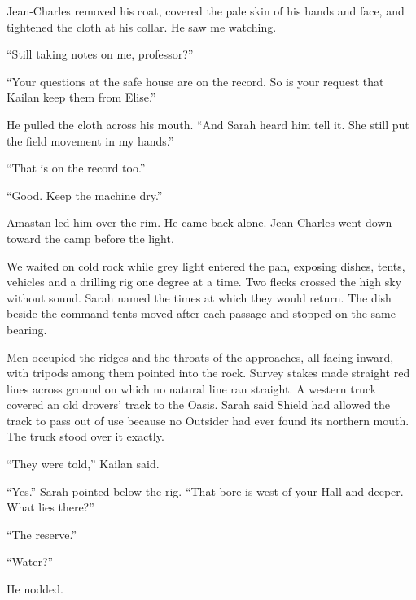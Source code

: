 Jean-Charles removed his coat, covered the pale skin of his hands and face, and tightened the cloth at his collar. He saw me watching.\par

``Still taking notes on me, professor?''\par

``Your questions at the safe house are on the record. So is your request that Kailan keep them from Elise.''\par

He pulled the cloth across his mouth. ``And Sarah heard him tell it. She still put the field movement in my hands.''\par

``That is on the record too.''\par

``Good. Keep the machine dry.''\par

Amastan led him over the rim. He came back alone. Jean-Charles went down toward the camp before the light.\par

We waited on cold rock while grey light entered the pan, exposing dishes, tents, vehicles and a drilling rig one degree at a time. Two flecks crossed the high sky without sound. Sarah named the times at which they would return. The dish beside the command tents moved after each passage and stopped on the same bearing.\par

Men occupied the ridges and the throats of the approaches, all facing inward, with tripods among them pointed into the rock. Survey stakes made straight red lines across ground on which no natural line ran straight. A western truck covered an old drovers' track to the Oasis. Sarah said Shield had allowed the track to pass out of use because no Outsider had ever found its northern mouth. The truck stood over it exactly.\par

``They were told,'' Kailan said.\par

``Yes.'' Sarah pointed below the rig. ``That bore is west of your Hall and deeper. What lies there?''\par

``The reserve.''\par

``Water?''\par

He nodded.\par

